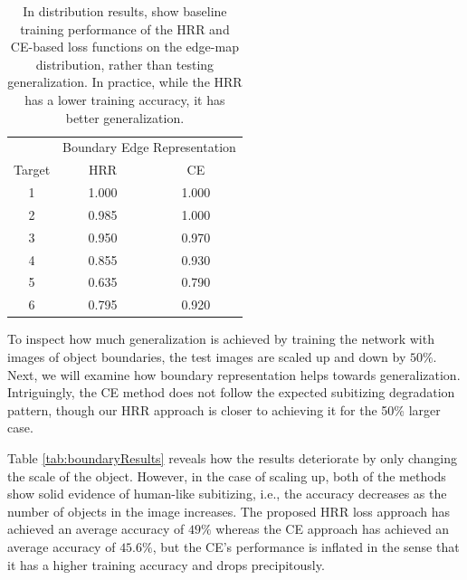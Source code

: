 \documentclass[letterpaper]{article} %
\begin{document}
\begin{table}[!htbp]%
\vspace{-10pt}
\centering
\begin{tabular}{@{}ccc@{}}
\toprule
      & \multicolumn{2}{c}{Boundary Edge Representation} \\ \cmidrule(l){2-3} 
Target & HRR           & CE            \\ \midrule
1      & 1.000         & 1.000         \\
2      & 0.985         & 1.000         \\
3      & 0.950         & 0.970         \\
4      & 0.855         & 0.930         \\
5      & 0.635         & 0.790         \\
6      & 0.795         & 0.920         \\ \bottomrule
\end{tabular}
\caption{In distribution results, show baseline training performance of the HRR and CE-based loss functions on the edge-map distribution, rather than testing generalization. In practice, while the HRR has a lower training accuracy, it has better generalization.} 
\label{tbl:boundary_train}
\end{table}

To inspect how much generalization is achieved by training the network with images of object boundaries, the test images are scaled up and down by $50\%$. Next, we will examine how boundary representation helps towards generalization. Intriguingly, the CE method does not follow the expected subitizing degradation pattern, though our HRR approach is closer to achieving it for the 50\% larger case.
\par 
Table \ref{tab:boundaryResults} reveals how the results deteriorate by only changing the scale of the object. However, in the case of scaling up, both of the methods show solid evidence of human-like subitizing, i.e., the accuracy decreases as the number of objects in the image increases. The proposed HRR loss approach has achieved an average accuracy of $49\%$ whereas the CE approach has achieved an average accuracy of $45.6\%$, but the CE's performance is inflated in the sense that it has a higher training accuracy and drops precipitously.
\end{document}
